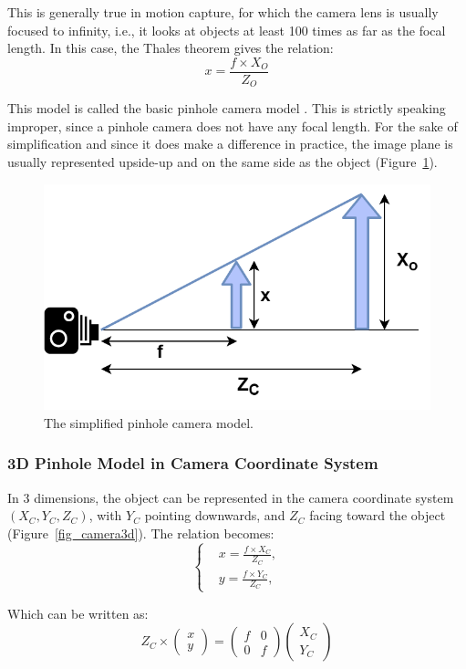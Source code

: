 This is generally true in motion capture, for which the camera lens is usually focused to infinity, i.e., it looks at objects at least 100 times as far as the focal length. In this case, the Thales theorem gives the relation:
\begin{equation}
  x=\frac{f\times X_O}{Z_O}
\end{equation}

This model is called the basic pinhole camera model \cite{Zhang2000,Hartley2003,Tomasi2017}. This is strictly speaking improper, since a pinhole camera does not have any focal length. For the sake of simplification and since it does make a difference in practice, the image plane is usually represented upside-up and on the same side as the object (Figure~\ref{fig_cameralens}). 

\begin{figure}[hbtp]
	\centering
	\def\svgwidth{\columnwidth}
	\fontsize{10pt}{10pt}\selectfont
	\includegraphics[width=0.5\linewidth]{"../Chap2/Figures/Camera_Lens.png"}
	\caption{The simplified pinhole camera model.} 
	\label{fig_cameralens}
\end{figure}


\FloatBarrier
\subsubsection{3D Pinhole Model in Camera Coordinate System}

In 3 dimensions, the object can be represented in the camera coordinate system $(X_C, Y_C, Z_C)$, with $Y_C$ pointing downwards, and $Z_C$ facing toward the object (Figure~\ref{fig_camera3d}). The relation becomes:
\begin{equation}
  \begin{cases}
  &x=\frac{f\times X_C}{Z_C},\\
  &y=\frac{f\times Y_C}{Z_C},
  \end{cases}
\end{equation}

Which can be written as:
\begin{equation}
  Z_C \times \begin{pmatrix}x\\y\end{pmatrix} 
  = \begin{pmatrix}f & 0 \\0 & f\end{pmatrix}\begin{pmatrix}X_C\\Y_C\end{pmatrix}
\end{equation}

